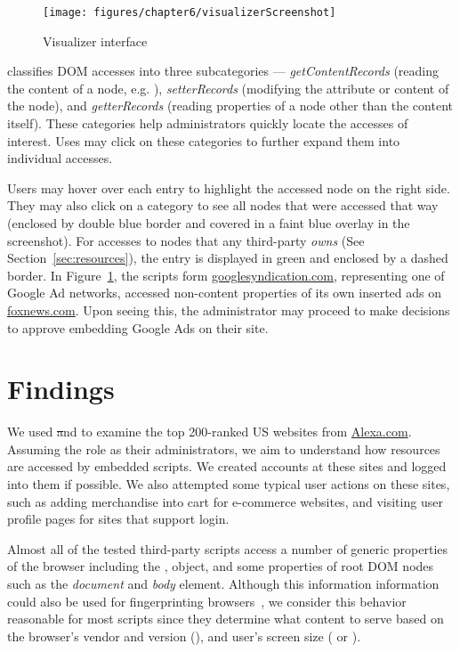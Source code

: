 \begin{figure}[!b]
\centering
\texttt{[image: figures/chapter6/visualizerScreenshot]}
\caption{Visualizer interface}
\label{fig:visualizerScreenshot}
\end{figure}

\vis classifies DOM accesses into three subcategories --- \emph{getContentRecords} (reading the content of a node,
e.g. ), \emph{setterRecords} (modifying the attribute or
content of the node), and \emph{getterRecords} (reading properties of a node
other than the content itself).  These categories help administrators quickly locate the accesses of interest.  Uses may click on these categories to further expand them into individual accesses.

Users may hover over each entry to highlight the
accessed node on the right side.  They may also click on a category
to see all nodes that were accessed that way (enclosed by double blue border and covered in a faint blue overlay in the screenshot).
For accesses to nodes that any third-party \emph{owns} (See Section~\ref{sec:resources}), the entry is displayed in green and enclosed by a dashed border.  In Figure~\ref{fig:visualizerScreenshot}, the scripts form \url{googlesyndication.com}, representing one of Google Ad networks,
accessed non-content properties of its own inserted ads on
\url{foxnews.com}.  Upon seeing this, the administrator may proceed to make
decisions to approve embedding Google Ads on their site.

\section{Findings}
\label{sec:visualizationStories}

We used \st and \vis to examine the top 200-ranked US websites from
\url{Alexa.com}.  Assuming the role as their administrators, we aim to
understand how resources are accessed by embedded scripts.  We created accounts at these sites and logged into them if possible.  We also attempted some typical user actions on these sites, such as adding merchandise into cart for e-commerce websites, and visiting user profile pages for sites that support login.

 Almost all of the tested third-party
scripts access a number of generic properties of the browser including
the ,  object, and some properties of root
DOM nodes such as the \emph{document} and \emph{body} element.  Although
this information information could also be used for fingerprinting
browsers~\cite{FPDetective}, we consider this behavior reasonable for
most scripts since they determine what content to serve based on the
browser's vendor and version (), and user's
screen size ( or ).

